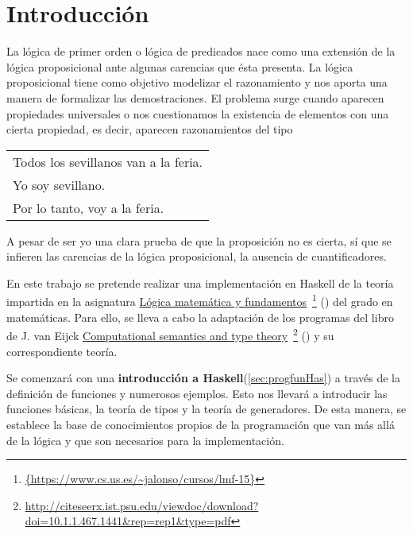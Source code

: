 \chapter*{Introducción}


La lógica de primer orden o lógica de predicados nace como una extensión de la
lógica proposicional ante algunas carencias que ésta presenta. La lógica
proposicional tiene como objetivo modelizar el razonamiento y nos aporta una
manera de formalizar las demostraciones. El problema surge cuando aparecen
propiedades universales o nos cuestionamos la existencia de elementos con una
cierta propiedad, es decir, aparecen razonamientos del tipo
\begin{center}
\begin{tabular}{l}
  Todos los sevillanos van a la feria. \\
  Yo soy sevillano.\\
  Por lo tanto, voy a la feria.
\end{tabular}
\end{center}
A pesar de ser yo una clara prueba de que la proposición no es cierta, sí que
se infieren las carencias de la lógica proposicional, la ausencia de cuantificadores.

\vspace{4mm}

En este trabajo se pretende realizar una implementación en Haskell de la teoría impartida en la asignatura
\href{https://www.cs.us.es/~jalonso/cursos/lmf-15}{Lógica matemática y fundamentos}\
\footnote{\url{{https://www.cs.us.es/~jalonso/cursos/lmf-15}}}
(\cite{Alonso-15a}) del grado en matemáticas.  Para ello, se lleva a cabo la adaptación de los programas del libro de
J. van Eijck 
\href{http://citeseerx.ist.psu.edu/viewdoc/download?doi=10.1.1.467.1441&rep=rep1&type=pdf}
{Computational semantics and type theory}\
\footnote{\url{http://citeseerx.ist.psu.edu/viewdoc/download?doi=10.1.1.467.1441&rep=rep1&type=pdf}}
(\cite{Eijck-03}) y su correspondiente teoría. 

\vspace{3mm}

Se comenzará con una \textbf{introducción a Haskell}(\ref{sec:progfunHas}) a través de
la definición de funciones y numerosos ejemplos. Esto nos llevará a introducir las
funciones básicas, la teoría de tipos y la teoría de generadores. De esta manera,
se establece la base de conocimientos propios de la programación que van  más allá de la lógica y que son necesarios para la implementación.

